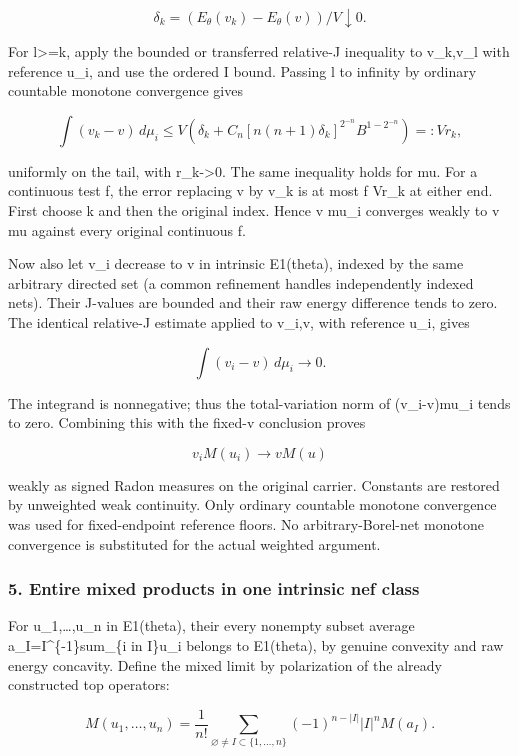 \documentclass[
]{article}
\begin{document}
\[\delta_k=(E_\theta(v_k)-E_\theta(v))/V\downarrow0.\]

For l\textgreater=k, apply the bounded or transferred relative-J
inequality to v\_k,v\_l with reference u\_i, and use the ordered I
bound. Passing l to infinity by ordinary countable monotone convergence
gives

\[\int(v_k-v)\,d\mu_i
\le V\left(\delta_k+C_n[n(n+1)\delta_k]^{2^{-n}}B^{1-2^{-n}}\right)=:Vr_k,\]

uniformly on the tail, with r\_k-\textgreater0. The same inequality
holds for mu. For a continuous test f, the error replacing v by v\_k is
at most \textbar\textbar f\textbar\textbar{} Vr\_k at either end. First
choose k and then the original index. Hence v mu\_i converges weakly to
v mu against every original continuous f.

Now also let v\_i decrease to v in intrinsic E1(theta), indexed by the
same arbitrary directed set (a common refinement handles independently
indexed nets). Their J-values are bounded and their raw energy
difference tends to zero. The identical relative-J estimate applied to
v\_i,v, with reference u\_i, gives

\[\int(v_i-v)\,d\mu_i\longrightarrow0.\]

The integrand is nonnegative; thus the total-variation norm of
(v\_i-v)mu\_i tends to zero. Combining this with the fixed-v conclusion
proves

\[v_i M(u_i)\longrightarrow vM(u)\]

weakly as signed Radon measures on the original carrier. Constants are
restored by unweighted weak continuity. Only ordinary countable monotone
convergence was used for fixed-endpoint reference floors. No
arbitrary-Borel-net monotone convergence is substituted for the actual
weighted argument.

\subsubsection{5. Entire mixed products in one intrinsic nef
class}\label{entire-mixed-products-in-one-intrinsic-nef-class}

For u\_1,\ldots,u\_n in E1(theta), their every nonempty subset average
a\_I=\textbar I\textbar\^{}\{-1\}sum\_\{i in I\}u\_i belongs to
E1(theta), by genuine convexity and raw energy concavity. Define the
mixed limit by polarization of the already constructed top operators:

\[M(u_1,\ldots,u_n)=\frac1{n!}
\sum_{\varnothing\ne I\subset\{1,\ldots,n\}}
(-1)^{n-|I|}|I|^nM(a_I).\]
\end{document}
